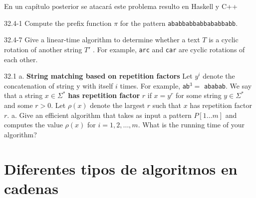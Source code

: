 \begin{algorithm}[H]
\end{algorithm}

En un capítulo posterior se atacará este problema resulto en Haskell y C++ %

\begin{tcolorbox}
32.4-1
Compute the prefix function $\pi$ for the pattern \texttt{ababbabbabbababbabb}.
\end{tcolorbox}

\begin{tcolorbox}
32.4-7
Give a linear-time algorithm to determine whether a text $T$ is a cyclic rotation of another string
$T'$ . For example, \texttt{arc} and \texttt{car} are cyclic rotations of each other.
\end{tcolorbox}

\begin{tcolorbox}
32.1 a.
\textbf{String matching based on repetition factors}
Let $y^i$ denote the concatenation of string y with itself $i$ times. For example,
\texttt{ab}$^3 =$ \texttt{ababab}. We say that a string $x \in \Sigma^*$
\textbf{has repetition factor} $r$ if $x = y^r$ for some string $y \in \Sigma^*$ and some $r > 0$.
Let $\rho(x)$ denote the largest $r$ such that $x$ has repetition factor $r$.
a. Give an efficient algorithm that takes as input a pattern $P[1 \ldots m]$ and computes the value
$\rho(x)$ for $i = 1,2,\ldots,m$. What is the running time of your algorithm?
\end{tcolorbox}


\section{Diferentes tipos de algoritmos en cadenas}
